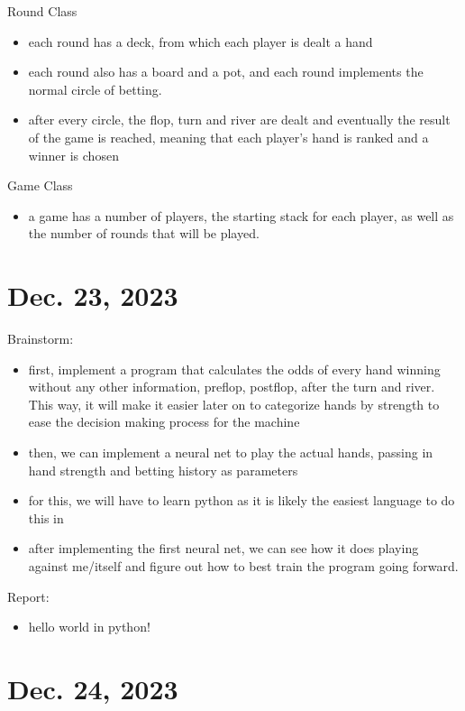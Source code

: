 \documentclass{article}
\begin{document}
\noindent Round Class
\begin{itemize}
    \item each round has a deck, from which 
each player is dealt a hand
    \item each round also has a board and a 
pot, and each round implements the normal 
circle of betting. 
    \item after every circle, the flop, turn
and river are dealt and eventually the result
of the game is reached, meaning that each 
player's hand is ranked and a winner is chosen
\end{itemize}

\noindent Game Class
\begin{itemize}
    \item a game has a number of players, the 
starting stack for each player, as well as the
number of rounds that will be played.
\end{itemize}

\section{Dec. 23, 2023}

Brainstorm:
\begin{itemize}
    \item first, implement a program that 
calculates the odds of every hand winning
without any other information, preflop, 
postflop, after the turn and river. This 
way, it will make it easier later on to 
categorize hands by strength to ease the 
decision making process for the machine
    \item then, we can implement a neural
net to play the actual hands, passing in
hand strength and betting history as 
parameters
    \item for this, we will have to learn 
python as it is likely the easiest language
to do this in
    \item after implementing the first 
neural net, we can see how it does playing
against me/itself and figure out how to 
best train the program going forward.
\end{itemize} 

\noindent Report:
\begin{itemize}
    \item hello world in python!
\end{itemize} 

\section{Dec. 24, 2023}
\end{document}
